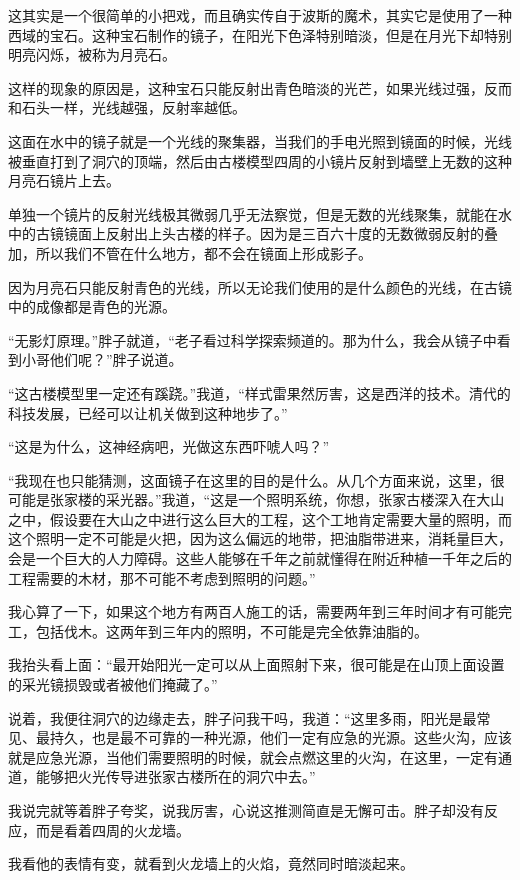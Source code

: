 这其实是一个很简单的小把戏，而且确实传自于波斯的魔术，其实它是使用了一种西域的宝石。这种宝石制作的镜子，在阳光下色泽特别暗淡，但是在月光下却特别明亮闪烁，被称为月亮石。

这样的现象的原因是，这种宝石只能反射出青色暗淡的光芒，如果光线过强，反而和石头一样，光线越强，反射率越低。

这面在水中的镜子就是一个光线的聚集器，当我们的手电光照到镜面的时候，光线被垂直打到了洞穴的顶端，然后由古楼模型四周的小镜片反射到墙壁上无数的这种月亮石镜片上去。

单独一个镜片的反射光线极其微弱几乎无法察觉，但是无数的光线聚集，就能在水中的古镜镜面上反射出上头古楼的样子。因为是三百六十度的无数微弱反射的叠加，所以我们不管在什么地方，都不会在镜面上形成影子。

因为月亮石只能反射青色的光线，所以无论我们使用的是什么颜色的光线，在古镜中的成像都是青色的光源。

“无影灯原理。”胖子就道，“老子看过科学探索频道的。那为什么，我会从镜子中看到小哥他们呢？”胖子说道。

“这古楼模型里一定还有蹊跷。”我道，“样式雷果然厉害，这是西洋的技术。清代的科技发展，已经可以让机关做到这种地步了。”

“这是为什么，这神经病吧，光做这东西吓唬人吗？”

“我现在也只能猜测，这面镜子在这里的目的是什么。从几个方面来说，这里，很可能是张家楼的采光器。”我道，“这是一个照明系统，你想，张家古楼深入在大山之中，假设要在大山之中进行这么巨大的工程，这个工地肯定需要大量的照明，而这个照明一定不可能是火把，因为这么偏远的地带，把油脂带进来，消耗量巨大，会是一个巨大的人力障碍。这些人能够在千年之前就懂得在附近种植一千年之后的工程需要的木材，那不可能不考虑到照明的问题。”

我心算了一下，如果这个地方有两百人施工的话，需要两年到三年时间才有可能完工，包括伐木。这两年到三年内的照明，不可能是完全依靠油脂的。

我抬头看上面：“最开始阳光一定可以从上面照射下来，很可能是在山顶上面设置的采光镜损毁或者被他们掩藏了。”

说着，我便往洞穴的边缘走去，胖子问我干吗，我道：“这里多雨，阳光是最常见、最持久，也是最不可靠的一种光源，他们一定有应急的光源。这些火沟，应该就是应急光源，当他们需要照明的时候，就会点燃这里的火沟，在这里，一定有通道，能够把火光传导进张家古楼所在的洞穴中去。”

我说完就等着胖子夸奖，说我厉害，心说这推测简直是无懈可击。胖子却没有反应，而是看着四周的火龙墙。

我看他的表情有变，就看到火龙墙上的火焰，竟然同时暗淡起来。

